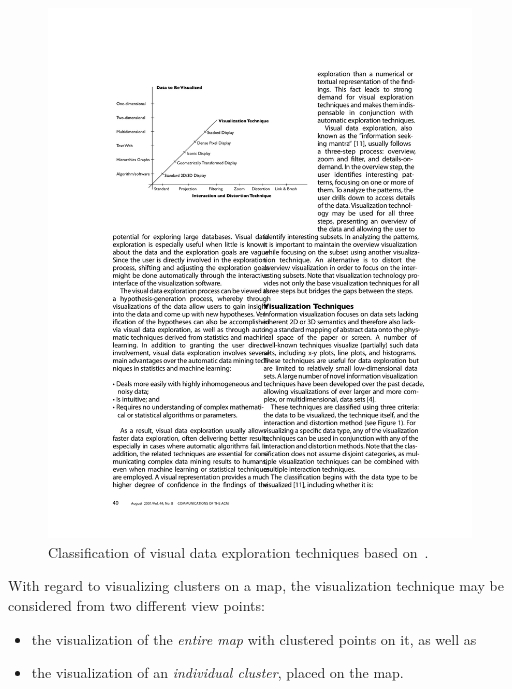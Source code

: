 \begin{figure}[h]
  \begin{center}
    \includegraphics[width=1\textwidth]{figures/classes_visual_techniques.pdf}
    \caption{Classification of visual data exploration techniques based on~\cite{keim2001vis}.}
    \label{fig:visual-techniques}
  \end{center}
\end{figure}


With regard to visualizing clusters on a map, the visualization technique may be considered from two different view points:

\begin{itemize}

\item the visualization of the \textit{entire map} with clustered points on it, as well as

\item the visualization of an \textit{individual cluster}, placed on the map.

\end{itemize}

